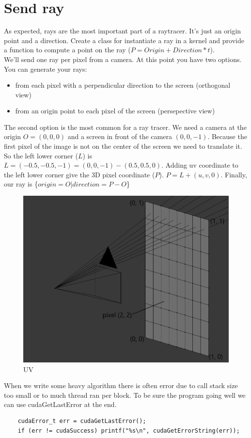 \documentclass{article}
\begin{document}
\section{Send ray}
As expected, rays are the most important part of a raytracer. It's just an origin point and a direction. Create a class for instantiate a ray in a kernel and provide a function to compute a point on the ray ($P = Origin + Direction*t$).\\
We'll send one ray per pixel from a camera. At this point you have two options. You can generate your rays:
\begin{itemize}
	\item from each pixel with a perpendicular direction to the screen (orthogonal view)
	\item from an origin point to each pixel of the screen (persepective view)
\end{itemize}
The second option is the most common for a ray tracer. We need a camera at the origin $O = (0, 0, 0)$ and a screen in front of the camera $(0, 0, -1)$. Because the first pixel of the image is not on the center of the screen we need to translate it. So the left lower corner ($L$) is $L = (-0.5, -0.5, -1) = (0, 0, -1) - (0.5, 0.5, 0)$. Adding uv coordinate to the left lower corner give the 3D pixel coordinate ($P$). $P = L + (u, v, 0)$. Finally, our ray is \{$origin=O | direction=P-O$\}
\begin{figure}[h]
	\centering
	\includegraphics[scale=0.5]{figures/screen.png}
	\caption{UV}
\end{figure}
When we write some heavy algorithm there is often error due to call stack size too small or to much thread ran per block. To be sure the program going well we can use cudaGetLastError at the end.
\begin{lstlisting}
	cudaError_t err = cudaGetLastError();
	if (err != cudaSuccess) printf("%s\n", cudaGetErrorString(err));
\end{lstlisting}
\end{document}
